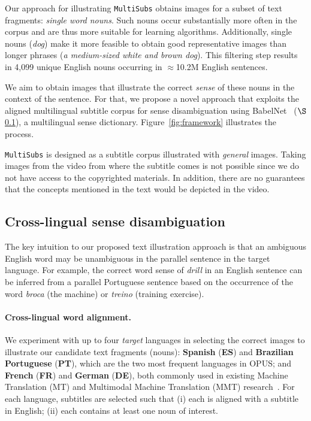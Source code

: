 \documentclass[twocolumn]{svjour3}          \smartqed  \usepackage{graphicx}
\newcommand{\multisubs}{\texttt{MultiSubs}\xspace}
\begin{document}
Our approach for illustrating \multisubs obtains images for a subset of text fragments: 
\emph{single word nouns}.
Such nouns occur substantially more often in the corpus and are thus more suitable for learning algorithms. Additionally, single nouns (\emph{dog}) make it more feasible to obtain good representative images than longer phrases (\emph{a medium-sized white and brown dog}). This filtering step results in 4,099 unique English nouns occurring in $\approx$10.2M English sentences.

We aim to obtain images that illustrate the correct \emph{sense} of these nouns in the context of the sentence. For that, we propose a novel approach that exploits the aligned multilingual subtitle corpus for sense disambiguation using BabelNet~\cite{NavigliPonzetto:2012} ($\S$\ref{sec:phrase-disambiguation}), a multilingual sense dictionary. Figure~\ref{fig:framework} illustrates the process.
 
 \multisubs is designed as a subtitle corpus illustrated with \emph{general} images. Taking images from the video from where the subtitle comes is not possible since we do not have access to the copyrighted materials. In addition, there are no guarantees that the concepts mentioned in the text would be depicted in the video.





\subsection{Cross-lingual sense disambiguation}
\label{sec:phrase-disambiguation}

The key intuition to our proposed text illustration approach is that an ambiguous English word may be unambiguous in the parallel sentence in the target language. For example, the correct word sense of \textit{drill} in an English sentence can be inferred from a parallel Portuguese sentence based on the occurrence of the word \textit{broca} (the machine) or \textit{treino} (training exercise).

\paragraph{Cross-lingual word alignment.} We experiment with up to four \emph{target} languages in selecting the correct images to illustrate our candidate text fragments (nouns): \textbf{Spanish} (\textbf{ES}) and \textbf{Brazilian Portuguese} (\textbf{PT}), which are the two most frequent languages in OPUS; and \textbf{French} (\textbf{FR}) and \textbf{German} (\textbf{DE}), both commonly used in existing Machine Translation (MT) and Multimodal Machine Translation (MMT) research~\cite{ElliottEtAl:2017}. For each language, subtitles are selected such that (i) each is aligned with a subtitle in English; (ii) each contains at least one noun of interest.
\end{document}
